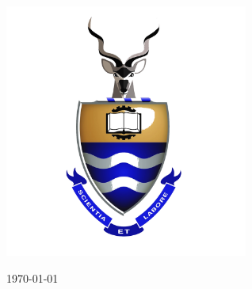 \documentclass[
12pt, %
oneside, %
english, %
onehalfspacing, %
nolistspacing, %
liststotoc, %
headsepline, %
]{ProposalAndThesis} %
\author{Willem Van Der Merwe 2914429} %
\begin{document}
\frontmatter %

\pagestyle{plain} %


\begin{titlepage}
\begin{center}

{\huge \bfseries \ttitle}\par\vspace{0.4cm} %
\HRule\par\vspace{1.5cm}
\authorname\par\vspace{1cm}
\par\vspace{0.5cm}

\includegraphics[width=80mm]{Figures/logoWitsstackedcolourtransparent.png} %
\vfill

\univname\par\vspace{0.4cm} %
\cleanlookdateon
\today %

\end{center}

\end{titlepage}
\end{document}

